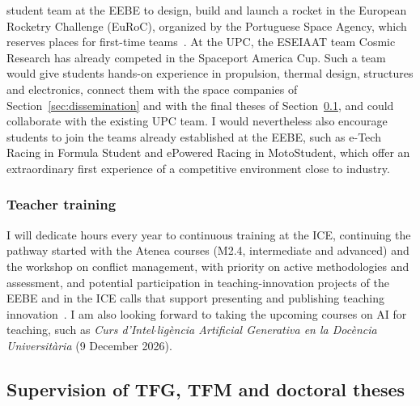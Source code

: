 \documentclass[11pt]{article}
\begin{document}
\begin{itemize}
{  student team at the EEBE to design, build and launch a rocket in the European Rocketry Challenge
  (EuRoC), organized by the Portuguese Space Agency, which reserves places for first-time
  teams~\cite{EuRoC2026}. At the UPC, the ESEIAAT team Cosmic Research has already competed in the
  Spaceport America Cup. Such a team would give students hands-on experience
  in propulsion, thermal design, structures and electronics, connect them with the space companies of
  Section~\ref{sec:dissemination} and with the final theses of Section~\ref{sec:theses}, and could
  collaborate with the existing UPC team. I would nevertheless also encourage students to join the
  teams already established at the EEBE, such as e-Tech Racing in Formula Student and ePowered Racing in
  MotoStudent, which offer an extraordinary first experience of a competitive environment close to
  industry.}
\end{itemize}


\subsubsection{Teacher training}

I will dedicate hours every year to continuous training at the ICE, continuing the pathway started with the Atenea courses (M2.4, intermediate and advanced) and the workshop on conflict management, with priority on active methodologies and assessment, and potential participation in teaching-innovation projects of the EEBE and in the ICE calls that support presenting and publishing teaching innovation~\cite{ICEAjuts2025}. I am also looking forward to taking the upcoming courses on AI for teaching, such as \textit{Curs d'Intel$\cdot$lig\`encia Artificial Generativa en la Doc\`encia Universit\`aria} (9 December 2026).


\subsection{Supervision of TFG, TFM and doctoral theses}\label{sec:theses}
\end{document}
